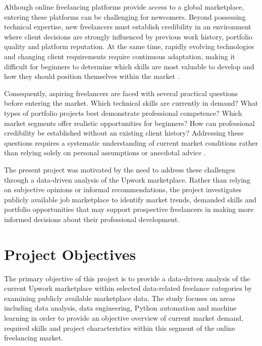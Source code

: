     Although online freelancing platforms provide access to a global marketplace, entering these platforms can be challenging for newcomers. 
    Beyond possessing technical expertise, new freelancers must establish credibility in an environment where client decisions are strongly 
    influenced by previous work history, portfolio quality and platform reputation. At the same time, rapidly evolving technologies and
    changing client requirements require continuous adaptation, making it difficult for beginners to determine which skills are most valuable to
    develop and how they should position themselves within the market \cite{oecd2023_freelancers,oecd2019_skillcertificates,oecd2019_skillsoutlook}.

    Consequently, aspiring freelancers are faced with several practical questions before entering the market.
    Which technical skills are currently in demand? What types of portfolio projects best demonstrate professional competence?
    Which market segments offer realistic opportunities for beginners? How can professional credibility be established without an
    existing client history? Addressing these questions requires a systematic understanding of current market conditions rather than
    relying solely on personal assumptions or anecdotal advice \cite{oecd2023_freelancers,oxford2020_learning}.

    The present project was motivated by the need to address these challenges through a data-driven analysis of the Upwork marketplace.
    Rather than relying on subjective opinions or informal recommendations, the project investigates publicly available job marketplace to
    identify market trends, demanded skills and portfolio opportunities that may support prospective freelancers in making more informed
    decisions about their professional development.

    \section{Project Objectives}
    
    The primary objective of this project is to provide a data-driven analysis of the current Upwork marketplace within selected data-related
    freelance categories by examining publicly available marketplace data. The study focuses on areas including data analysis, data engineering,
    Python automation and machine learning in order to provide an objective overview of current market demand, required skills and project
    characteristics within this segment of the online freelancing market.

